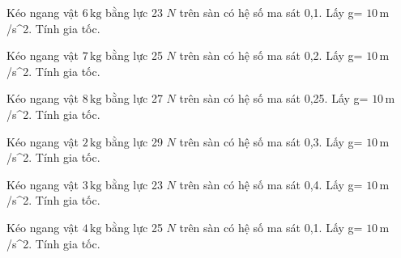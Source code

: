 \begin{ex}
Kéo ngang vật $6\,\text{kg}$ bằng lực 23 $N$ trên sàn có hệ số ma sát 0,1. Lấy g= $10\,\text{m}$ /s^2. Tính gia tốc.
\end{ex}

\begin{ex}
Kéo ngang vật $7\,\text{kg}$ bằng lực 25 $N$ trên sàn có hệ số ma sát 0,2. Lấy g= $10\,\text{m}$ /s^2. Tính gia tốc.
\end{ex}

\begin{ex}
Kéo ngang vật $8\,\text{kg}$ bằng lực 27 $N$ trên sàn có hệ số ma sát 0,25. Lấy g= $10\,\text{m}$ /s^2. Tính gia tốc.
\end{ex}

\begin{bt}
Kéo ngang vật $2\,\text{kg}$ bằng lực 29 $N$ trên sàn có hệ số ma sát 0,3. Lấy g= $10\,\text{m}$ /s^2. Tính gia tốc.
\end{bt}

\begin{bt}
Kéo ngang vật $3\,\text{kg}$ bằng lực 23 $N$ trên sàn có hệ số ma sát 0,4. Lấy g= $10\,\text{m}$ /s^2. Tính gia tốc.
\end{bt}

\begin{bt}
Kéo ngang vật $4\,\text{kg}$ bằng lực 25 $N$ trên sàn có hệ số ma sát 0,1. Lấy g= $10\,\text{m}$ /s^2. Tính gia tốc.
\end{bt}

